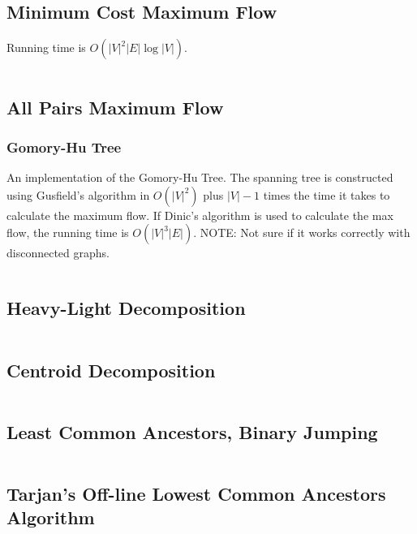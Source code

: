 \documentclass[8pt,a4paper,landscape,oneside]{amsart}
\newcommand{\code}[1]{\inputminted[fontsize=\normalsize,baselinestretch=1]{cpp}{_code/#1}}
\newif\ifverbose
\begin{document}
\begin{multicols*}{3}
    \subsection{Minimum Cost Maximum Flow}
        \ifverbose
        An implementation of Edmonds Karp's algorithm, modified to find
        shortest path to augment each time (instead of just any path). It
        computes the maximum flow of a flow network, and when there are
        multiple maximum flows, finds the maximum flow with minimum cost.
        \fi
        Running time is $O(|V|^2|E|\log|V|)$.
        \code{graph/edmonds_karps_mcmf.cpp}

    \subsection{All Pairs Maximum Flow}
        \subsubsection{Gomory-Hu Tree}
        An implementation of the Gomory-Hu Tree. The spanning tree is constructed using Gusfield's algorithm
        in $O(|V| ^ 2)$ plus $|V|-1$ times the time it takes to calculate the maximum flow.
        If Dinic's algorithm is used to calculate the max flow, the running time is $O(|V|^3|E|)$.
        NOTE: Not sure if it works correctly with disconnected graphs.
        \code{graph/gomory_hu_tree.cpp}

    \subsection{Heavy-Light Decomposition}
        \code{graph/hld.cpp}

    \subsection{Centroid Decomposition}
        \code{graph/centroid_decomposition.cpp}

    \subsection{Least Common Ancestors, Binary Jumping}
        \code{graph/lca.cpp}

    \subsection{Tarjan's Off-line Lowest Common Ancestors Algorithm}
        \code{graph/tarjan_olca.cpp}


\end{multicols*}
\end{document}
